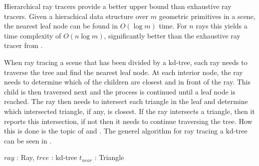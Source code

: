 
Hierarchical ray tracers provide a better upper bound than exhaustive ray
tracers. Given a hierachical data structure over $m$ geometric primitives in a
scene, the nearest leaf node can be found in $O(\log m)$ time. For $n$ rays
this yields a time complexity of $O(n \log m)$, significantly better than the
exhaustive ray tracer from .


When ray tracing a scene that has been divided by a kd-tree, each ray needs to
traverse the tree and find the nearest leaf node. At each interior node, the ray
needs to determine which of the children are closest and in front of the
ray. This child is then traversed next and the process is continued until a leaf
node is reached. The ray then needs to intersect each triangle in the leaf and
determine which intersected triangle, if any, is closest. If the ray intersects
a triangle, then it reports this intersection, if not then it needs to continue
traversing the tree. How this is done is the topic of 
and . The generel algorithm for ray tracing a kd-tree
can be seen in .

\begin{algorithm}
  \caption{A generel kd-tree traversal algorithm for ray tracing}
  \label{alg:generelTracing}
  \begin{algorithmic}
              {$ray$ : Ray, $tree$ : kd-tree}
              {$t_{near}$ : Triangle}{
                  \ELSE
                  \ENDIF
                \ENDWHILE
              }
  \end{algorithmic}
\end{algorithm}

